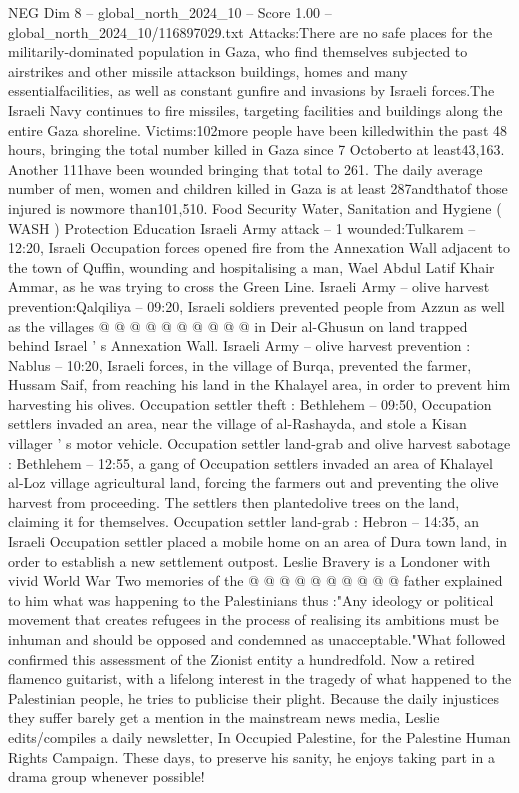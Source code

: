 \begin{textsample}{NEG Dim 8 – global\_north\_2024\_10 – Score 1.00 – global\_north\_2024\_10/116897029.txt}  \label{ex:f8_neg_204}
Attacks:There are no safe places for the militarily-dominated population in Gaza, who find themselves subjected to airstrikes and other missile attackson buildings, homes and many essentialfacilities, as well as constant gunfire and invasions by Israeli forces.The Israeli Navy continues to fire missiles, targeting facilities and buildings along the entire Gaza shoreline.
Victims:102more people have been killedwithin the past 48 hours, bringing the total number killed in Gaza since 7 Octoberto at least43,163.
Another 111have been wounded bringing that total to 261.
The daily average number of men, women and children killed in Gaza is at least 287andthatof those injured is nowmore than101,510.
Food Security Water, Sanitation and Hygiene ( WASH ) Protection Education Israeli Army attack -- 1 wounded:Tulkarem -- 12:20, Israeli Occupation forces opened fire from the Annexation Wall adjacent to the town of Quffin, wounding and hospitalising a man, Wael Abdul Latif Khair Ammar, as he was trying to cross the Green Line.
Israeli Army -- olive harvest prevention:Qalqiliya -- 09:20, Israeli soldiers prevented people from Azzun as well as the villages @ @ @ @ @ @ @ @ @ @ in Deir al-Ghusun on land trapped behind Israel ' s Annexation Wall.
Israeli Army -- olive harvest prevention : Nablus -- 10:20, Israeli forces, in the village of Burqa, prevented the farmer, Hussam Saif, from reaching his land in the Khalayel area, in order to prevent him harvesting his olives.
Occupation settler theft : Bethlehem -- 09:50, Occupation settlers invaded an area, near the village of al-Rashayda, and stole a Kisan villager ' s motor vehicle.
Occupation settler land-grab and olive harvest sabotage : Bethlehem -- 12:55, a gang of Occupation settlers invaded an area of Khalayel al-Loz village agricultural land, forcing the farmers out and preventing the olive harvest from proceeding.
The settlers then plantedolive trees on the land, claiming it for themselves.
Occupation settler land-grab : Hebron -- 14:35, an Israeli Occupation settler placed a mobile home on an area of Dura town land, in order to establish a new settlement outpost.
Leslie Bravery is a Londoner with vivid World War Two memories of the @ @ @ @ @ @ @ @ @ @ father explained to him what was happening to the Palestinians thus :"Any ideology or political movement that creates refugees in the process of realising its ambitions must be inhuman and should be opposed and condemned as unacceptable."What followed confirmed this assessment of the Zionist entity a hundredfold.
Now a retired flamenco guitarist, with a lifelong interest in the tragedy of what happened to the Palestinian people, he tries to publicise their plight.
Because the daily injustices they suffer barely get a mention in the mainstream news media, Leslie edits/compiles a daily newsletter, In Occupied Palestine, for the Palestine Human Rights Campaign.
These days, to preserve his sanity, he enjoys taking part in a drama group whenever possible!

\end{textsample}
